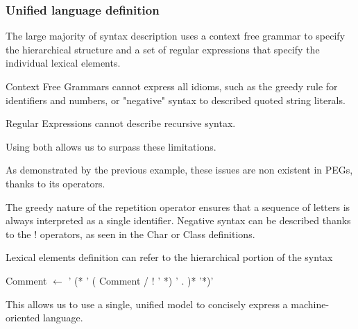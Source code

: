 \begin{frame}
	\frametitle{Unified language definition}
	
\begin{block}{}	The large majority of syntax description uses a context free grammar to specify the hierarchical structure and a set of regular expressions that specify the individual lexical elements.

\end{block}
\begin{block}{}
	Context Free Grammars cannot express all idioms, such as the greedy rule for identifiers and numbers, or "negative" syntax to described quoted string literals. 
\end{block}
\begin{block}{}
	Regular Expressions cannot describe recursive syntax.
\end{block}
\begin{block}{}
		Using both allows us to surpass these limitations.
\end{block}
\end{frame}
\begin{frame}
	\begin{block}{}
			As demonstrated by the previous example, these issues are non existent in PEGs, thanks to its operators. 
	\end{block}
	\begin{block}{}
		The greedy nature of the repetition operator ensures that a sequence of letters is always interpreted as a single identifier.  Negative syntax can be described thanks to the ! operators, as seen in the Char or Class definitions. 
	\end{block}
\begin{block}{}
	Lexical elements definition can refer to the hierarchical portion of the syntax
	\begin{center}
		\footnotesize
		Comment $\leftarrow$  ' (* '    ( Comment /  !  ’ *) ’   . )*        ’*)’
	\end{center}
\end{block}
\begin{block}{}
	This allows us to use a single, unified model to concisely express a machine-oriented language.
\end{block}
\end{frame}

